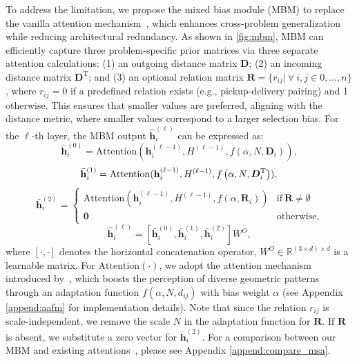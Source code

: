 \documentclass{article}
\theoremstyle{plain}
\theoremstyle{definition}
\theoremstyle{remark}
\begin{document}
To address the limitation, we propose the mixed bias module (MBM) to replace the vanilla attention mechanism~\citep{vaswani2017attention}, which enhances cross-problem generalization while reducing architectural redundancy. As shown in \cref{fig:mbm}, MBM can efficiently capture three problem-specific prior matrices via three separate attention calculations: (1) an outgoing distance matrix $\bm{D}$; (2) an incoming distance matrix $\bm{D}^{\mathrm{T}}$; and (3) an optional relation matrix $\bm{R}=\{r_{ij}| \ \forall \  i,j \in 0, \ldots, n\}$, where $r_{ij} = 0$ if a predefined relation exists (e.g., pickup-delivery pairing) and 1 otherwise. This ensures that smaller values are preferred, aligning with the distance metric, where smaller values correspond to a larger selection bias. For the $\ell$-th layer, the MBM output $\hat{\mathbf{h}}_i^{(\ell)}$ can be expressed as:
\begin{equation}
\bar{\mathbf{h}}_{i}^{(0)} = \mathrm{Attention}(\mathbf{h}_i^{(\ell-1)}, H^{(\ell-1)}, f\left(\alpha,N,\bm{D}_{i}\right)),
\end{equation}
\begin{equation}
\bar{\mathbf{h}}_{i}^{(1)} = \mathrm{Attention}(\mathbf{h}_i^{(\ell-1)}, H^{(\ell-1)}, f\left(\alpha,N,\bm{D}_{i}^{\mathrm{T}}\right)), \\
\end{equation}
\begin{equation}
\bar{\mathbf{h}}_{i}^{(2)} = 
    \begin{cases}
    \mathrm{Attention}(\mathbf{h}_i^{(\ell-1)}, H^{(\ell-1)}, f\left(\alpha,\bm{R}_{i}\right))   & \text{if} \ \bm{R} \neq \emptyset \\
    \bm{0}  &\text{otherwise}, 
    \end{cases}
\label{eq:mdm_attn}
\end{equation}
\begin{equation}
\hat{\mathbf{h}}_i^{(\ell)} = \left[\bar{\mathbf{h}}_{i}^{(0)},\bar{\mathbf{h}}_{i}^{(1)},\bar{\mathbf{h}}_{i}^{(2)}\right]W^{O},
    \label{eq:mixed_bias_module}
\end{equation}
where $[\cdot,\cdot]$ denotes the horizontal concatenation operator, $W^{O}\in \mathbb{R}^{(3\times d)\times d}$ is a learnable matrix. For $\mathrm{Attention}(\cdot)$,  we adopt the attention mechanism introduced by~\citet{zhou2024icam}, which boosts the perception of diverse geometric patterns through an adaptation function $f(\alpha, N,d_{ij})$ with bias weight $\alpha$ (see Appendix \ref{append:aafm} for implementation details). Note that since the relation $r_{ij}$ is scale-independent, we remove the scale $N$ in the adaptation function for $\bm{R}$. If $\bm{R}$ is absent, we substitute a zero vector for $\bar{\mathbf{h}}_{i}^{(2)}$. For a comparison between our MBM and existing attentions~\citep{vaswani2017attention,kwon2021matnet}, please see Appendix \ref{append:compare_msa}.
\end{document}
